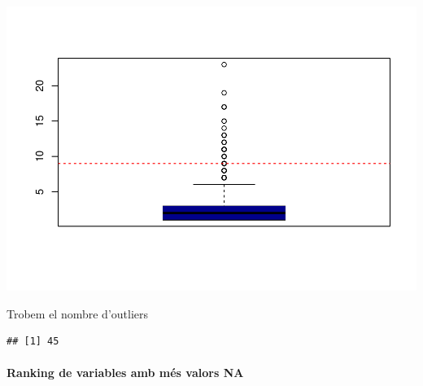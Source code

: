 \documentclass[
]{article}
\newenvironment{Shaded}{\begin{snugshade}}{\end{snugshade}}
\newcommand{\FunctionTok}[1]{\textcolor[rgb]{0.00,0.00,0.00}{#1}}
\newcommand{\NormalTok}[1]{#1}
\newcommand{\OtherTok}[1]{\textcolor[rgb]{0.56,0.35,0.01}{#1}}
\newcommand{\SpecialCharTok}[1]{\textcolor[rgb]{0.00,0.00,0.00}{#1}}
\begin{document}
\includegraphics{Entrega-1_files/figure-latex/unnamed-chunk-35-1.pdf}

Trobem el nombre d'outliers

\begin{Shaded}
\end{Shaded}

\begin{verbatim}
## [1] 45
\end{verbatim}

\hypertarget{ranking-de-variables-amb-muxe9s-valors-na}{%
\paragraph{Ranking de variables amb més valors
NA}\label{ranking-de-variables-amb-muxe9s-valors-na}}
\end{document}
